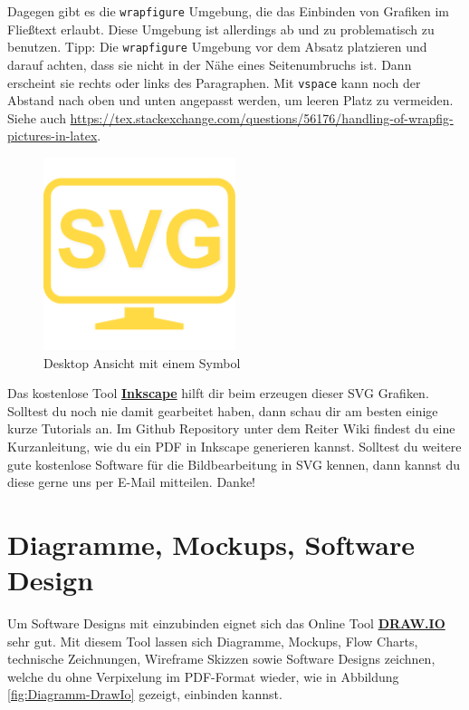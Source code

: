 Dagegen gibt es die \texttt{wrapfigure} Umgebung, die das Einbinden von Grafiken im Fließtext erlaubt.
Diese Umgebung ist allerdings ab und zu problematisch zu benutzen.
Tipp: Die \texttt{wrapfigure} Umgebung vor dem Absatz platzieren und darauf achten, dass sie nicht in der Nähe eines Seitenumbruchs ist.
Dann erscheint sie rechts oder links des Paragraphen. Mit \texttt{vspace} kann noch der Abstand nach oben und unten angepasst werden, um leeren Platz zu vermeiden.
Siehe auch \url{https://tex.stackexchange.com/questions/56176/handling-of-wrapfig-pictures-in-latex}.

\begin{figure}[ht]
	\centering
	\includegraphics[width=0.50\textwidth]{images/desktop-screen.pdf} 
	\caption{Desktop Ansicht mit einem Symbol}
	\label{fig:Referenz-auf-Bild}
\end{figure}

Das kostenlose Tool \href{https://inkscape.org/}{\textbf{Inkscape}} hilft dir beim erzeugen dieser SVG Grafiken. Solltest du noch nie damit gearbeitet haben, dann schau dir am besten einige kurze Tutorials an. Im Github Repository unter dem Reiter Wiki findest du eine Kurzanleitung, wie du ein PDF in Inkscape generieren kannst. Solltest du weitere gute kostenlose Software für die Bildbearbeitung in SVG kennen, dann kannst du diese gerne uns per E-Mail mitteilen. Danke!

\section{Diagramme, Mockups, Software Design}

Um Software Designs mit einzubinden eignet sich das Online Tool \textbf{\href{https://www.draw.io/}{DRAW.IO}} sehr gut. Mit diesem Tool lassen sich Diagramme, Mockups, Flow Charts, technische Zeichnungen, Wireframe Skizzen sowie Software Designs zeichnen, welche du ohne Verpixelung im PDF-Format wieder, wie in Abbildung \ref{fig:Diagramm-DrawIo} gezeigt, einbinden kannst.

